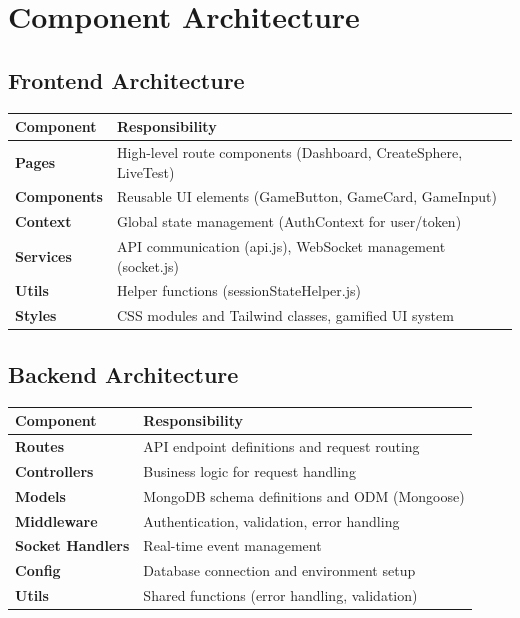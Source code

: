 \documentclass[12pt,a4paper]{report}
\newenvironment{reqbox}{%
  \begin{tcolorbox}[colback=lightgray,colframe=rulecol,
    leftrule=3pt,rightrule=0.4pt,toprule=0.4pt,bottomrule=0.4pt,
    arc=2pt,boxsep=2pt,left=4pt,right=4pt,top=3pt,bottom=3pt,breakable]
}{\end{tcolorbox}}
\newcommand{\rA}{\rowcolor{white}}
\newcommand{\rB}{\rowcolor{lightgray}}
\newcommand{\rH}{\rowcolor{headcol}}
\begin{document}
\vspace{1cm}

\section{Component Architecture}

\subsection{Frontend Architecture}

\begin{reqbox}
  \begin{tabular}{|l|p{7cm}|}
    \hline
    \rH \textbf{Component} & \textbf{Responsibility} \\
    \hline
    \rA \textbf{Pages} & High-level route components (Dashboard, CreateSphere, LiveTest) \\
    \hline
    \rB \textbf{Components} & Reusable UI elements (GameButton, GameCard, GameInput) \\
    \hline
    \rA \textbf{Context} & Global state management (AuthContext for user/token) \\
    \hline
    \rB \textbf{Services} & API communication (api.js), WebSocket management (socket.js) \\
    \hline
    \rA \textbf{Utils} & Helper functions (sessionStateHelper.js) \\
    \hline
    \rB \textbf{Styles} & CSS modules and Tailwind classes, gamified UI system \\
    \hline
  \end{tabular}
\end{reqbox}

\subsection{Backend Architecture}

\begin{reqbox}
  \begin{tabular}{|l|p{7cm}|}
    \hline
    \rH \textbf{Component} & \textbf{Responsibility} \\
    \hline
    \rA \textbf{Routes} & API endpoint definitions and request routing \\
    \hline
    \rB \textbf{Controllers} & Business logic for request handling \\
    \hline
    \rA \textbf{Models} & MongoDB schema definitions and ODM (Mongoose) \\
    \hline
    \rB \textbf{Middleware} & Authentication, validation, error handling \\
    \hline
    \rA \textbf{Socket Handlers} & Real-time event management \\
    \hline
    \rB \textbf{Config} & Database connection and environment setup \\
    \hline
    \rA \textbf{Utils} & Shared functions (error handling, validation) \\
    \hline
  \end{tabular}
\end{reqbox}
\end{document}
